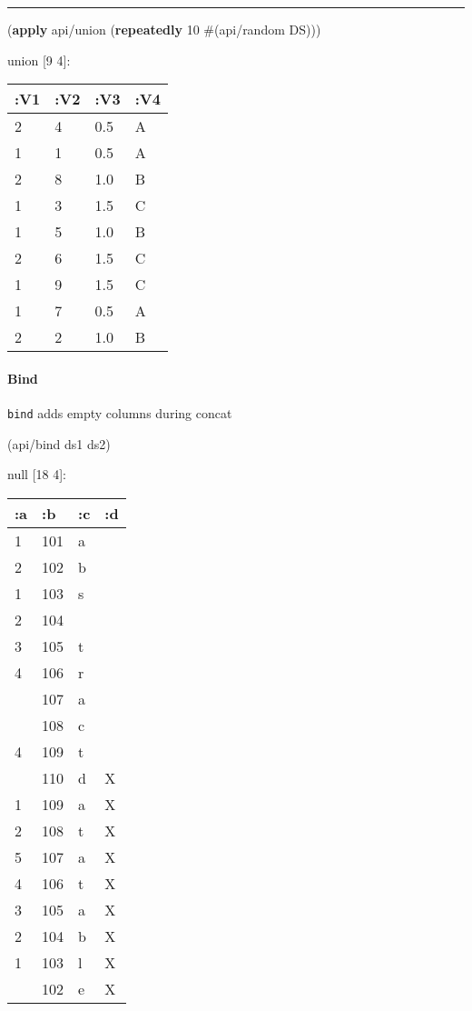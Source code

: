 \documentclass[]{article}
\newenvironment{Shaded}{\begin{snugshade}}{\end{snugshade}}
\newcommand{\DecValTok}[1]{\textcolor[rgb]{0.00,0.00,0.81}{#1}}
\newcommand{\KeywordTok}[1]{\textcolor[rgb]{0.13,0.29,0.53}{\textbf{#1}}}
\newcommand{\NormalTok}[1]{#1}
\let\oldparagraph\paragraph
\renewcommand{\paragraph}[1]{\oldparagraph{#1}\mbox{}}
\begin{document}
\begin{center}\rule{0.5\linewidth}{0.5pt}\end{center}

\begin{Shaded}
\begin{Highlighting}[]
\NormalTok{(}\KeywordTok{apply}\NormalTok{ api/union (}\KeywordTok{repeatedly} \DecValTok{10}\NormalTok{ #(api/random DS)))}
\end{Highlighting}
\end{Shaded}

union {[}9 4{]}:

\begin{longtable}[]{@{}llll@{}}
\toprule
:V1 & :V2 & :V3 & :V4\tabularnewline
\midrule
\endhead
2 & 4 & 0.5 & A\tabularnewline
1 & 1 & 0.5 & A\tabularnewline
2 & 8 & 1.0 & B\tabularnewline
1 & 3 & 1.5 & C\tabularnewline
1 & 5 & 1.0 & B\tabularnewline
2 & 6 & 1.5 & C\tabularnewline
1 & 9 & 1.5 & C\tabularnewline
1 & 7 & 0.5 & A\tabularnewline
2 & 2 & 1.0 & B\tabularnewline
\bottomrule
\end{longtable}

\hypertarget{bind}{%
\paragraph{Bind}\label{bind}}

\texttt{bind} adds empty columns during concat

\begin{Shaded}
\begin{Highlighting}[]
\NormalTok{(api/bind ds1 ds2)}
\end{Highlighting}
\end{Shaded}

null {[}18 4{]}:

\begin{longtable}[]{@{}llll@{}}
\toprule
:a & :b & :c & :d\tabularnewline
\midrule
\endhead
1 & 101 & a &\tabularnewline
2 & 102 & b &\tabularnewline
1 & 103 & s &\tabularnewline
2 & 104 & &\tabularnewline
3 & 105 & t &\tabularnewline
4 & 106 & r &\tabularnewline
& 107 & a &\tabularnewline
& 108 & c &\tabularnewline
4 & 109 & t &\tabularnewline
& 110 & d & X\tabularnewline
1 & 109 & a & X\tabularnewline
2 & 108 & t & X\tabularnewline
5 & 107 & a & X\tabularnewline
4 & 106 & t & X\tabularnewline
3 & 105 & a & X\tabularnewline
2 & 104 & b & X\tabularnewline
1 & 103 & l & X\tabularnewline
& 102 & e & X\tabularnewline
\bottomrule
\end{longtable}
\end{document}

